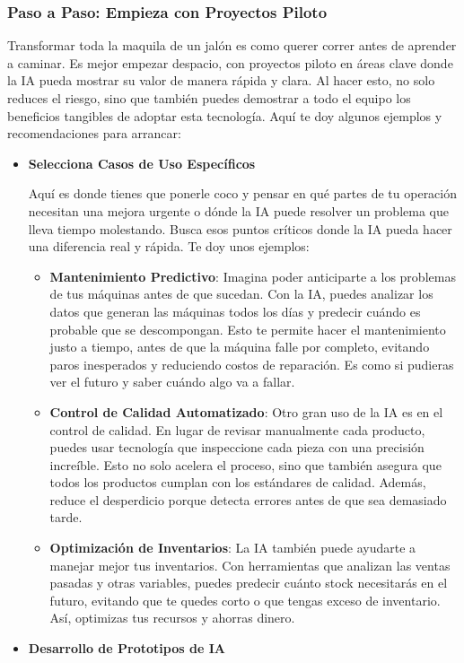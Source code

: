 \documentclass[
  letterpaper,
]{book}
\begin{document}
\subsubsection{\texorpdfstring{\textbf{Paso a Paso: Empieza con
Proyectos
Piloto}}{Paso a Paso: Empieza con Proyectos Piloto}}\label{paso-a-paso-empieza-con-proyectos-piloto}

Transformar toda la maquila de un jalón es como querer correr antes de
aprender a caminar. Es mejor empezar despacio, con proyectos piloto en
áreas clave donde la IA pueda mostrar su valor de manera rápida y clara.
Al hacer esto, no solo reduces el riesgo, sino que también puedes
demostrar a todo el equipo los beneficios tangibles de adoptar esta
tecnología. Aquí te doy algunos ejemplos y recomendaciones para
arrancar:

\begin{itemize}
\item
  \textbf{Selecciona Casos de Uso Específicos}

  Aquí es donde tienes que ponerle coco y pensar en qué partes de tu
  operación necesitan una mejora urgente o dónde la IA puede resolver un
  problema que lleva tiempo molestando. Busca esos puntos críticos donde
  la IA pueda hacer una diferencia real y rápida. Te doy unos ejemplos:

  \begin{itemize}
  \item
    \textbf{Mantenimiento Predictivo}: Imagina poder anticiparte a los
    problemas de tus máquinas antes de que sucedan. Con la IA, puedes
    analizar los datos que generan las máquinas todos los días y
    predecir cuándo es probable que se descompongan. Esto te permite
    hacer el mantenimiento justo a tiempo, antes de que la máquina falle
    por completo, evitando paros inesperados y reduciendo costos de
    reparación. Es como si pudieras ver el futuro y saber cuándo algo va
    a fallar.
  \item
    \textbf{Control de Calidad Automatizado}: Otro gran uso de la IA es
    en el control de calidad. En lugar de revisar manualmente cada
    producto, puedes usar tecnología que inspeccione cada pieza con una
    precisión increíble. Esto no solo acelera el proceso, sino que
    también asegura que todos los productos cumplan con los estándares
    de calidad. Además, reduce el desperdicio porque detecta errores
    antes de que sea demasiado tarde.
  \item
    \textbf{Optimización de Inventarios}: La IA también puede ayudarte a
    manejar mejor tus inventarios. Con herramientas que analizan las
    ventas pasadas y otras variables, puedes predecir cuánto stock
    necesitarás en el futuro, evitando que te quedes corto o que tengas
    exceso de inventario. Así, optimizas tus recursos y ahorras dinero.
  \end{itemize}
\item
  \textbf{Desarrollo de Prototipos de IA}


\end{itemize}
\end{document}
